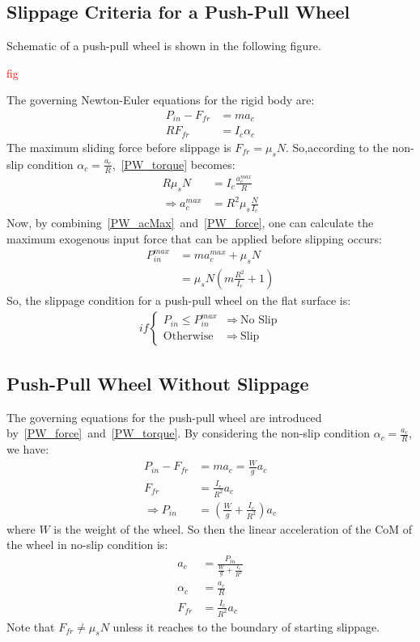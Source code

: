\documentclass[letterpaper, 10pt, conference]{ieeeconf}
\begin{document}
\subsection{Slippage Criteria for a Push-Pull Wheel} \label{SlipCri-PW}

Schematic of a push-pull wheel is shown in the following figure.

\textcolor{red}{fig}

The governing Newton-Euler equations for the rigid body are:
\begin{align}
P_{in} - F_{fr} &= ma_c \label{PW_force} \\
RF_{fr} &= I_c \alpha_c \label{PW_torque}
\end{align}
The maximum sliding force before slippage is $F_{fr} = \mu_sN$. So,according to the non-slip condition $\alpha_c = \frac{a_c}{R}$,~\eqref{PW_torque} becomes:
\begin{align}
R\mu_sN &= I_c \frac{a_c^{max}}{R} \\
\Rightarrow a_c^{max} &= R^2 \mu_s \frac{N}{I_c} \label{PW_acMax}
\end{align}
Now, by combining~\eqref{PW_acMax}~and~\eqref{PW_force}, one can calculate the maximum exogenous input force that can be applied before slipping occurs:
\begin{align}
P_{in}^{max} &= ma_c^{max} + \mu_sN \\
& = \mu_sN (m\frac{R^2}{I_c} + 1)
\end{align}
So, the slippage condition for a push-pull wheel on the flat surface is:
\begin{align}
if \begin{cases}
P_{in} \leqslant P_{in}^{max} &\Rightarrow \ \text{No Slip} \\
\text{Otherwise} &\Rightarrow \ \text{Slip}
\end{cases} \label{PW_slipCondition}
\end{align}
\subsection{Push-Pull Wheel Without Slippage}

The governing equations for the push-pull wheel are introduced by~\eqref{PW_force}~and~\eqref{PW_torque}. By considering the non-slip condition $\alpha_c = \frac{a_c}{R}$, we have:
\begin{align}
P_{in} - F_{fr} &= ma_c = \frac{W}{g} a_c \\
F_{fr} &= \frac{I_c}{R^2} a_c \\
\Rightarrow P_{in} &= (\frac{W}{g} + \frac{I_c}{R^2})a_c
\end{align}
where $W$ is the weight of the wheel. So then the linear acceleration of the CoM of the wheel in no-slip condition is:
\begin{align}
a_c &= \frac{P_{in}}{\frac{W}{g} + \frac{I_c}{R^2}} \\
\alpha_c &= \frac{a_c}{R} \\
F_{fr} &= \frac{I_c}{R^2} a_c
\end{align}
Note that $F_{fr} \neq \mu_{s}N$ unless it reaches to the boundary of starting slippage.
\end{document}
